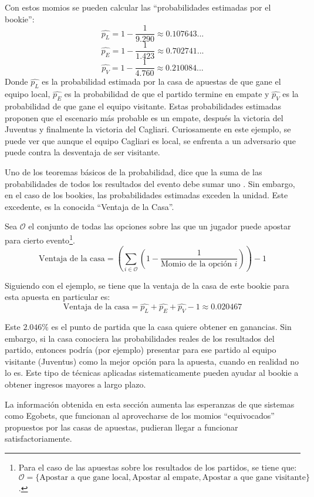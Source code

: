 Con estos momios se pueden calcular las ``probabilidades estimadas por el bookie'':
\[\hat{p_L} = 1 - \frac{1}{9.290} \approx 0.107643...\] 
\[\hat{p_E} = 1 - \frac{1}{1.423} \approx 0.702741...\]
\[\hat{p_V} = 1 - \frac{1}{4.760} \approx 0.210084...\]
Donde $\hat{p_L}$ es la probabilidad estimada por la casa de apuestas de que gane el equipo local, $\hat{p_E}$ es la probabilidad de que el partido termine en empate y $\hat{p_V}$ es la probabilidad de que gane el equipo visitante.
Estas probabilidades estimadas proponen que el escenario más probable es un empate, después la victoria del Juventus y finalmente la victoria del Cagliari. Curiosamente en este ejemplo, se puede ver que aunque el equipo Cagliari es local, se enfrenta a un adversario que puede contra la desventaja de ser visitante.

Uno de los teoremas básicos de la probabilidad, dice que la suma de las probabilidades de todos los resultados del evento debe sumar uno \cite{ross2006first}. Sin embargo, en el caso de los bookies, las probabilidades estimadas exceden la unidad. Este excedente, es la conocida ``Ventaja de la Casa''.

Sea $\mathcal{O}$ el conjunto de todas las opciones sobre las que un jugador puede apostar para cierto evento\footnote{Para el caso de las apuestas sobre los resultados de los partidos, se tiene que: $\mathcal{O} = \{\text{Apostar a que gane local}, \text{Apostar al empate}, \text{Apostar a que gane visitante}\}$.}.
\[\text{Ventaja de la casa} =  \left(\sum_{i \in \mathcal{O}}{\left(1 - \frac{1}{\text{Momio de la opción } i}\right)}\right) - 1\] 

Siguiendo con el ejemplo, se tiene que la ventaja de la casa de este bookie para esta apuesta en particular es:
\[\text{Ventaja de la casa} = \hat{p_L} + \hat{p_E} + \hat{p_V} - 1 \approx 0.020467\]

Este $2.046\%$ es el punto de partida que la casa quiere obtener en ganancias. Sin embargo, si la casa conociera las probabilidades reales de los resultados del partido, entonces podría (por ejemplo) presentar para ese partido al equipo visitante (Juventus) como la mejor opción para la apuesta, cuando en realidad no lo es. Este tipo de técnicas aplicadas sistematicamente pueden ayudar al bookie a obtener ingresos mayores a largo plazo.

La información obtenida en esta sección aumenta las esperanzas de que sistemas como Egobets, que funcionan al aprovecharse de los momios ``equivocados'' propuestos por las casas de apuestas, pudieran llegar a funcionar satisfactoriamente.


